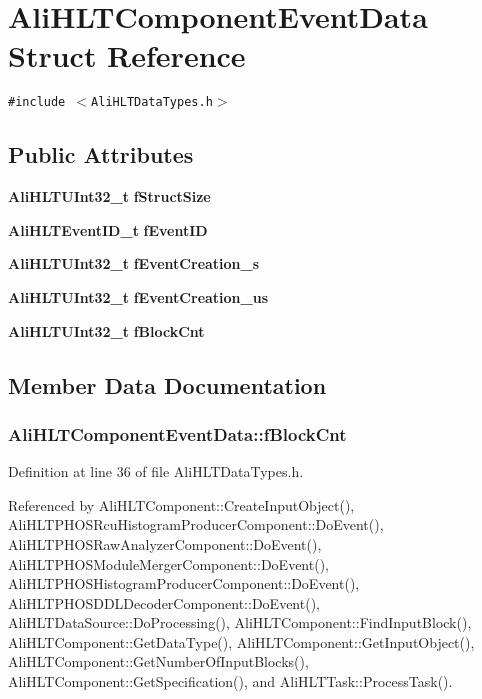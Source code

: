 \section{Ali\-HLTComponent\-Event\-Data Struct Reference}
\label{structAliHLTComponentEventData}
{\tt \#include $<$Ali\-HLTData\-Types.h$>$}

\subsection*{Public Attributes}
\begin{CompactItemize}
\item 
{\bf Ali\-HLTUInt32\_\-t} {\bf f\-Struct\-Size}
\item 
{\bf Ali\-HLTEvent\-ID\_\-t} {\bf f\-Event\-ID}
\item 
{\bf Ali\-HLTUInt32\_\-t} {\bf f\-Event\-Creation\_\-s}
\item 
{\bf Ali\-HLTUInt32\_\-t} {\bf f\-Event\-Creation\_\-us}
\item 
{\bf Ali\-HLTUInt32\_\-t} {\bf f\-Block\-Cnt}
\end{CompactItemize}


\subsection{Member Data Documentation}
\subsubsection{ {\bf Ali\-HLTComponent\-Event\-Data::f\-Block\-Cnt}}\label{structAliHLTComponentEventData_o4}




Definition at line 36 of file Ali\-HLTData\-Types.h.

Referenced by Ali\-HLTComponent::Create\-Input\-Object(), Ali\-HLTPHOSRcu\-Histogram\-Producer\-Component::Do\-Event(), Ali\-HLTPHOSRaw\-Analyzer\-Component::Do\-Event(), Ali\-HLTPHOSModule\-Merger\-Component::Do\-Event(), Ali\-HLTPHOSHistogram\-Producer\-Component::Do\-Event(), Ali\-HLTPHOSDDLDecoder\-Component::Do\-Event(), Ali\-HLTData\-Source::Do\-Processing(), Ali\-HLTComponent::Find\-Input\-Block(), Ali\-HLTComponent::Get\-Data\-Type(), Ali\-HLTComponent::Get\-Input\-Object(), Ali\-HLTComponent::Get\-Number\-Of\-Input\-Blocks(), Ali\-HLTComponent::Get\-Specification(), and Ali\-HLTTask::Process\-Task().

